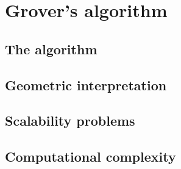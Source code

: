 \chapter{Grover's algorithm}
\section{The algorithm}\label{sec:the-algorithm}
\section{Geometric interpretation}
\section{Scalability problems}
\section{Computational complexity}